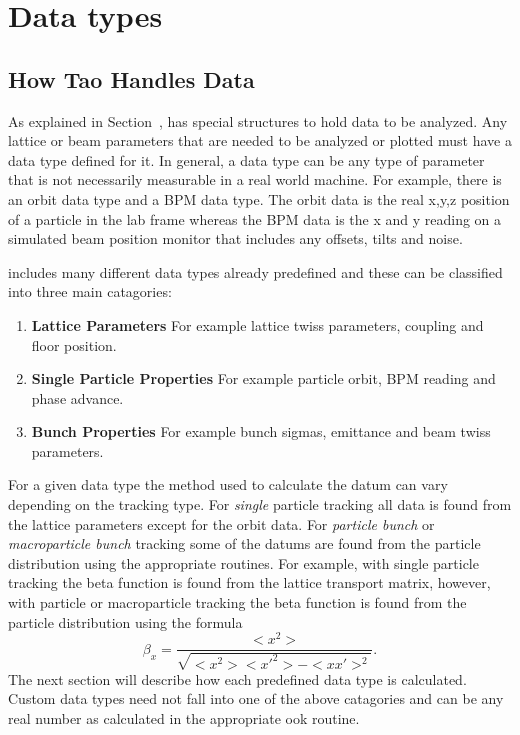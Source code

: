 \chapter{Data types}
\label{c:data_types}

\section{How Tao Handles Data}

As explained in Section~, \tao has special structures
to hold data to be analyzed. Any lattice or beam parameters that are
needed to be analyzed or plotted must have a data type defined for
it. In general, a data type can be any type of parameter that is not
necessarily measurable in a real world machine. For example, there is
an orbit data type and a BPM data type. The orbit data is the real
x,y,z position of a particle in the lab frame whereas the BPM data is
the x and y reading on a simulated beam position monitor that includes
any offsets, tilts and noise.

\tao includes many different data types already predefined and
these can be classified into three main catagories:
\begin{enumerate}
  \item \textbf{Lattice Parameters} \Newline
    For example lattice twiss parameters, coupling and floor position.
  \item \textbf{Single Particle Properties} \Newline
    For example particle orbit, BPM reading and phase advance.
  \item \textbf{Bunch Properties} \Newline
    For example bunch sigmas, emittance and beam twiss parameters.
\end{enumerate}
For a given data type the method used to calculate the datum can vary
depending on the tracking type. For {\it single} particle tracking all
data is found from the lattice parameters except for the orbit
data. For \textit{particle bunch} or \textit{macroparticle bunch}
tracking some of the datums are found from the particle distribution
using the appropriate \bmad routines. For example, with single
particle tracking the beta function is found from the lattice
transport matrix, however, with particle or macroparticle tracking the
beta function is found from the particle distribution using the
formula
\begin{equation}
  \beta_x = \frac{<x^{2}>}{\sqrt{<x^{2}> <x'^{2}> - <x x'>^{2}}}.
\end{equation}
The next section will describe how each predefined data type is
calculated.  Custom data types need not fall into one of the above
catagories and can be any real number as calculated in the appropriate
ook routine.

